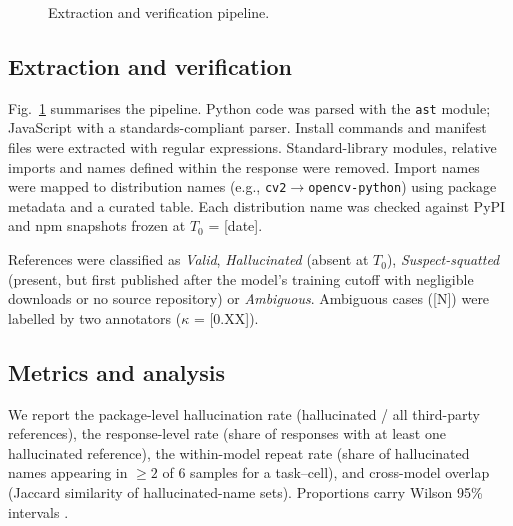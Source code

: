 \documentclass[conference]{IEEEtran}
\begin{document}
\begin{figure}[t]
\centering
{}
\caption{Extraction and verification pipeline.}
\label{fig:pipeline}
\end{figure}

\subsection{Extraction and verification}
Fig.~\ref{fig:pipeline} summarises the pipeline. Python code was parsed with the \texttt{ast} module; JavaScript with a standards-compliant parser. Install commands and manifest files were extracted with regular expressions. Standard-library modules, relative imports and names defined within the response were removed. Import names were mapped to distribution names (e.g., \texttt{cv2}$\rightarrow$\texttt{opencv-python}) using package metadata and a curated table. Each distribution name was checked against PyPI and npm snapshots frozen at $T_0$ = [date].

References were classified as \emph{Valid}, \emph{Hallucinated} (absent at $T_0$), \emph{Suspect-squatted} (present, but first published after the model's training cutoff with negligible downloads or no source repository) or \emph{Ambiguous}. Ambiguous cases ([N]) were labelled by two annotators ($\kappa$ = [0.XX]).

\subsection{Metrics and analysis}
We report the package-level hallucination rate (hallucinated / all third-party references), the response-level rate (share of responses with at least one hallucinated reference), the within-model repeat rate (share of hallucinated names appearing in $\geq 2$ of 6 samples for a task--cell), and cross-model overlap (Jaccard similarity of hallucinated-name sets). Proportions carry Wilson 95\% intervals \cite{wilson1927}.
\end{document}
